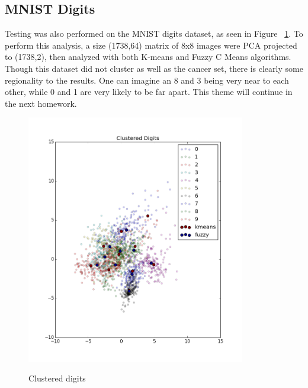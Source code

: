 \documentclass{article}
\begin{document}
\subsection*{MNIST Digits}
Testing was also performed on the MNIST digits dataset, as seen in 
Figure ~\ref{fig:f4}.
To perform this analysis, a size (1738,64) matrix of 8x8 images were PCA 
projected to (1738,2), then analyzed with both K-means and Fuzzy C Means algorithms.
Though this dataset did not cluster as well as the cancer set, there is clearly some regionality
to the results. One can imagine an 8 and 3 being very near to each other, while
0 and 1 are very likely to be far apart. This theme will continue in the next homework.
\begin{figure}[h!]
    \caption{Clustered digits}
  \centering
    \includegraphics[width=0.85\textwidth]{digitscluster.png}
  \label{fig:f4}
\end{figure}
\end{document}
